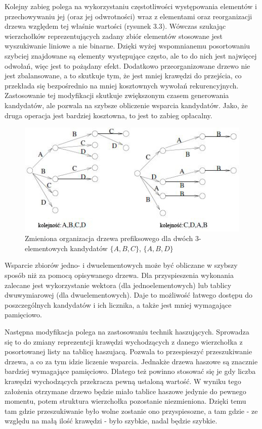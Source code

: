 Kolejny zabieg polega na wykorzystaniu częstotliwości występowania elementów i przechowywaniu jej (oraz jej odwrotności) wraz z elementami oraz reorganizacji drzewa względem tej właśnie wartości (rysunek 3.3). Wówczas szukając wierzchołków reprezentujących zadany zbiór elementów stosowane jest wyszukiwanie liniowe a nie binarne. Dzięki wyżej wspomnianemu posortowaniu szybciej znajdowane są elementy występujące często, ale to do nich jest najwięcej odwołań, więc jest to pożądany efekt. Dodatkowo przeorganizowane drzewo nie jest zbalansowane, a to skutkuje tym, że jest mniej krawędzi do przejścia, co przekłada się bezpośrednio na mniej kosztownych wywołań rekurencyjnych. Zastosowanie tej modyfikacji skutkuje zwiększonym czasem generowania kandydatów, ale pozwala na szybsze obliczenie wsparcia kandydatów. Jako, że druga operacja jest bardziej kosztowna, to jest to zabieg opłacalny.
\begin{figure}[h]
	\centering
	\includegraphics[width=0.8\linewidth]{figures/reorderedTreeBodon}
	\caption[Rysunek 3.3]{Zmieniona organizacja drzewa prefiksowego dla dwóch 3-elementowych kandydatów \(\{A, B, C\}\), \(\{A, B, D\}\)}
	\label{fig:reorderedTreeBodon}
\end{figure}


Wsparcie zbiorów jedno- i dwuelementowych może być obliczane w szybszy sposób niż za pomocą opisywanego drzewa. Dla przyspieszenia wykonania zalecane jest wykorzystanie wektora (dla jednoelementowych) lub tablicy dwuwymiarowej (dla dwuelementowych). Daje to możliwość łatwego dostępu do poszczególnych kandydatów i ich licznika, a także jest mniej wymagające pamięciowo. 

Następna modyfikacja polega na zastosowaniu technik haszujących. Sprowadza się to do zmiany reprezentcji krawędzi wychodzących z danego wierzchołka z posortowanej listy na tablicę haszujacą. Pozwala to przespieszyć przeszukiwanie drzewa, a co za tym idzie liczenie wsparcia. Jednakże drzewa haszowe są znacznie bardziej wymagające pamięciowo. Dlatego też powinno stosować się je gdy liczba krawędzi wychodzących przekracza pewną ustaloną wartość. W wyniku tego założenia otrzymane drzewo będzie miało tablice haszowe jedynie do pewnego momentu, potem struktura wierzchołka pozostanie niezmieniona. Dzięki temu tam gdzie przeszukiwanie było wolne zostanie ono przyspiesozne, a tam gdzie - ze względu na małą ilość krawędzi - było szybkie, nadal będzie szybkie. 


